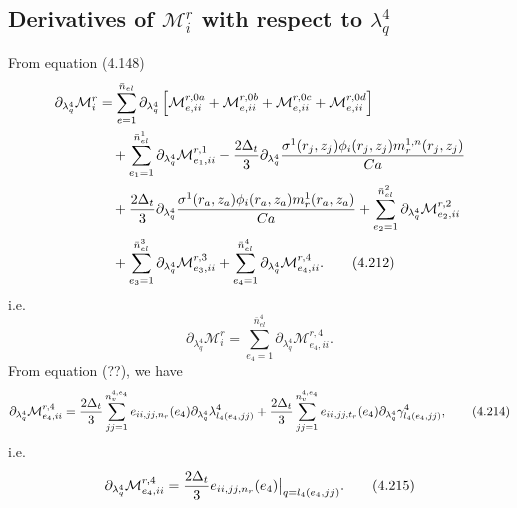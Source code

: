 \documentclass{article}
\begin{document}
\subsection{Derivatives of $\mathcal{M}_i^r$ with respect to $\lambda_q^4$} %
From equation (4.148)
\begin{align}
\partial_{\lambda_q^4}\mathcal{M}_i^r &= \sum_{e=1}^{\bar{n}_{el}} \partial_{\lambda_q^4} \left[ \mathcal{M}_{e,ii}^{r,0a} + \mathcal{M}_{e,ii}^{r,0b} + \mathcal{M}_{e,ii}^{r,0c} + \mathcal{M}_{e,ii}^{r,0d} \right] \nonumber\\
&\quad + \sum_{e_1=1}^{\bar{n}_{el}^1} \partial_{\lambda_q^4} \mathcal{M}_{e_1,ii}^{r,1} 
- \frac{2\Delta_t}{3} \partial_{\lambda_q^4} \frac{\sigma^1(r_j,z_j) \phi_i(r_j,z_j) m_r^{1,n}(r_j,z_j)}{Ca} \nonumber\\
&\quad + \frac{2\Delta_t}{3} \partial_{\lambda_q^4} \frac{\sigma^1(r_a,z_a) \phi_i(r_a,z_a) m_r^{1}(r_a,z_a)}{Ca} 
+ \sum_{e_2=1}^{\bar{n}_{el}^2} \partial_{\lambda_q^4} \mathcal{M}_{e_2,ii}^{r,2} \nonumber\\
&\quad + \sum_{e_3=1}^{\bar{n}_{el}^3} \partial_{\lambda_q^4} \mathcal{M}_{e_3,ii}^{r,3} 
+ \sum_{e_4=1}^{\bar{n}_{el}^4} \partial_{\lambda_q^4} \mathcal{M}_{e_4,ii}^{r,4}. \tag{4.212}
\end{align}
i.e.
\begin{equation}
\partial_{\lambda_q^4}\mathcal{M}_i^r = \sum_{e_4=1}^{\bar{n}_{el}^4} \partial_{\lambda_q^4} \mathcal{M}_{e_4,ii}^{r,4}. \tag{4.213}
\end{equation}
From equation (??), we have
\begin{equation}
\partial_{\lambda_q^4}\mathcal{M}_{e_4,ii}^{r,4} = \frac{2\Delta_t}{3} \sum_{jj=1}^{n_v^{4,e_4}} e_{ii,jj,n_r}(e_4) \partial_{\lambda_q^4} \lambda_{l_4(e_4,jj)}^4 
+ \frac{2\Delta_t}{3} \sum_{jj=1}^{n_v^{4,e_4}} e_{ii,jj,t_r}(e_4) \partial_{\lambda_q^4} \gamma_{l_4(e_4,jj)}^4, \tag{4.214}
\end{equation}
i.e.
\begin{equation}
\partial_{\lambda_q^4}\mathcal{M}_{e_4,ii}^{r,4} = \frac{2\Delta_t}{3} e_{ii,jj,n_r}(e_4) \big|_{q=l_4(e_4,jj)}. \tag{4.215}
\end{equation}
\end{document}
